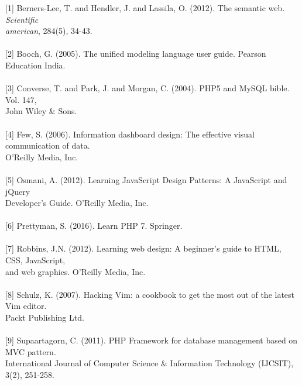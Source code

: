 \documentclass[12pt]{report}
\begin{document}
{[1]} \quad Berners-Lee, T. and Hendler, J. and Lassila, O. (2012). The semantic web. \textit{Scientific}
\\
\hspace*{0.38in}
\textit{american}, 284(5), 34-43.
\\\\
{[2]} \quad Booch, G. (2005). The unified modeling language user guide. Pearson Education India.
\\\\
{[3]} \quad Converse, T. and Park, J. and Morgan, C. (2004). PHP5 and MySQL bible. Vol. 147,
\\
\hspace*{0.38in}
John Wiley \& Sons.
\\\\
{[4]} \quad Few, S. (2006). Information dashboard design: The effective visual communication of data.
\\
\hspace*{0.38in}
O'Reilly Media, Inc.
\\\\
{[5]} \quad Osmani, A. (2012). Learning JavaScript Design Patterns: A JavaScript and jQuery 
\\
\hspace*{0.38in}
Developer's Guide. O'Reilly Media, Inc.
\\\\
{[6]} \quad Prettyman, S. (2016). Learn PHP 7. Springer.
\\\\
{[7]} \quad Robbins, J.N. (2012). Learning web design: A beginner's guide to HTML, CSS, JavaScript,
\\
\hspace*{0.38in}
and web graphics. O'Reilly Media, Inc.
\\\\
{[8]} \quad Schulz, K. (2007). Hacking Vim: a cookbook to get the most out of the latest Vim editor.
\\
\hspace*{0.38in}
Packt Publishing Ltd.
\\\\
{[9]} \quad Supaartagorn, C. (2011). PHP Framework for database management based on MVC pattern.
\\
\hspace*{0.38in}
International Journal of Computer Science \& Information Technology (IJCSIT),
\\
\hspace*{0.38in}
3(2), 251-258.
\\\\
\end{document}

